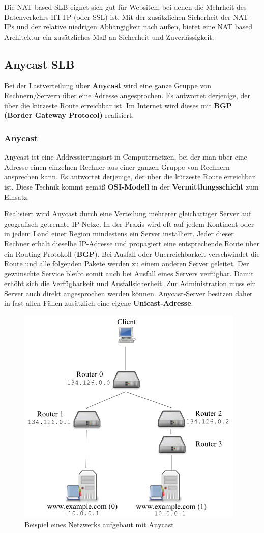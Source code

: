 Die NAT based SLB eignet sich gut für Websiten, bei denen die Mehrheit des Datenverkehrs HTTP (oder SSL) ist. Mit der zusätzlichen Sicherheit der NAT-IPs und der relative niedrigen Abhängigkeit nach außen, bietet eine NAT based Architektur ein zusätzliches Maß an Sicherheit und Zuverlässigkeit.
\newpage


\subsection{Anycast SLB}\cite{AS}
\label{anySLB}
Bei der Lastverteilung über \textbf{Anycast} wird eine ganze Gruppe von Rechnern/Servern über eine Adresse angesprochen. Es antwortet derjenige, der über die kürzeste Route erreichbar ist. Im Internet wird dieses mit \textbf{BGP (Border Gateway Protocol)} realisiert.

\subsubsection{Anycast}\cite{anycast}
Anycast ist eine Addressierungsart in Computernetzen, bei der man über eine Adresse einen einzelnen Rechner aus einer ganzen Gruppe von Rechnern ansprechen kann. Es antwortet derjenige, der über die kürzeste Route erreichbar ist. Diese Technik kommt gemäß \textbf{OSI-Modell} in der \textbf{Vermittlungsschicht} zum Einsatz.

Realisiert wird Anycast durch eine Verteilung mehrerer gleichartiger Server auf geografisch getrennte IP-Netze. In der Praxis wird oft auf jedem Kontinent oder in jedem Land einer Region mindestens ein Server installiert. Jeder dieser Rechner erhält dieselbe IP-Adresse und propagiert eine entsprechende Route über ein Routing-Protokoll (\textbf{BGP}). Bei Ausfall oder Unerreichbarkeit verschwindet die Route und alle folgenden Pakete werden zu einem anderen Server geleitet. Der gewünschte Service bleibt somit auch bei Ausfall eines Servers verfügbar. Damit erhöht sich die Verfügbarkeit und Ausfallsicherheit. Zur Administration muss ein Server auch direkt angesprochen werden können. Anycast-Server besitzen daher in fast allen Fällen zusätzlich eine eigene \textbf{Unicast-Adresse}.

\begin{figure}[!h]
	\begin{center}
		\includegraphics[width=0.5\linewidth]{images/anycast_slb}
		\caption{Beispiel eines Netzwerks aufgebaut mit Anycast}
		\label{anycast_slb_01}
	\end{center}
\end{figure}
